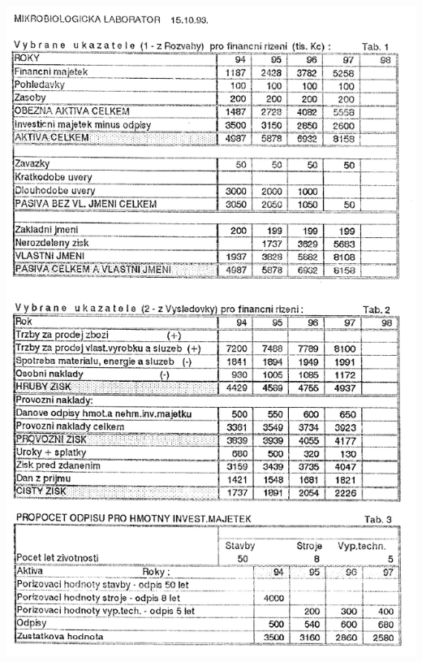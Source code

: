 \documentclass [10pt, fancyhdr, twoside] {article}
\begin{document}
\includegraphics[width=\textwidth,height=\textheight,keepaspectratio]{./vesna3-obr3.png}
\end{document}
